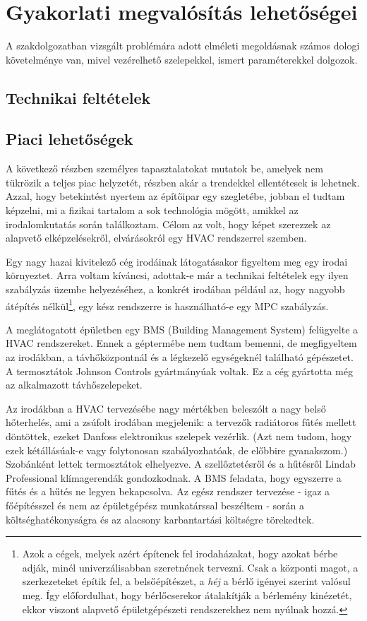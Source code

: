\chapter{Gyakorlati megvalósítás lehetőségei}

A szakdolgozatban vizsgált problémára adott elméleti megoldásnak számos dologi követelménye van, mivel vezérelhető szelepekkel, ismert paraméterekkel dolgozok. 

\section{Technikai feltételek}


\section{Piaci lehetőségek}

A következő részben személyes tapasztalatokat mutatok be, amelyek nem tükrözik a teljes piac helyzetét, részben akár a trendekkel ellentétesek is lehetnek. Azzal, hogy betekintést nyertem az építőipar egy szegletébe, jobban el tudtam képzelni, mi a fizikai tartalom a sok technológia mögött, amikkel az irodalomkutatás során találkoztam. Célom az volt, hogy képet szerezzek az alapvető elképzelésekről, elvárásokról egy HVAC rendszerrel szemben.

Egy nagy hazai kivitelező cég irodáinak látogatásakor figyeltem meg egy irodai környeztet. Arra voltam kíváncsi, adottak-e már a technikai feltételek egy ilyen szabályzás üzembe helyezéséhez, a konkrét irodában például az, hogy nagyobb átépítés nélkül\footnote{Azok a cégek, melyek azért építenek fel irodaházakat, hogy azokat bérbe adják, minél univerzálisabban szeretnének tervezni. Csak a központi magot, a szerkezeteket építik fel, a belsőépítészet, a \textit{héj} a bérlő igényei szerint valósul meg. Így előfordulhat, hogy bérlőcserekor átalakítják a bérlemény kinézetét, ekkor viszont alapvető épületgépészeti rendszerekhez nem nyúlnak hozzá.}, egy kész rendszerre is használható-e egy MPC szabályzás.

A meglátogatott épületben egy BMS (Building Management System) felügyelte a HVAC rendszereket. Ennek a géptermébe nem tudtam bemenni, de megfigyeltem az irodákban, a távhőközpontnál és a légkezelő egységeknél található gépészetet. A termosztátok Johnson Controls gyártmányúak voltak. Ez a cég gyártotta még az alkalmazott távhőszelepeket.

Az irodákban a HVAC tervezésébe nagy mértékben beleszólt a nagy belső hőterhelés, ami a zsúfolt irodában megjelenik: a tervezők radiátoros fűtés mellett döntöttek, ezeket Danfoss elektronikus szelepek vezérlik. (Azt nem tudom, hogy ezek kétállásúak-e vagy folytonosan szabályozhatóak, de előbbire gyanakszom.) Szobánként lettek termosztátok elhelyezve. A szellőztetésről és a hűtésről Lindab Professional klímagerendák gondozkodnak. A BMS feladata, hogy egyszerre a fűtés és a hűtés ne legyen bekapcsolva. Az egész rendszer tervezése - igaz a főépítésszel és nem az épületgépész munkatárssal beszéltem - során a költséghatékonyságra és az alacsony karbantartási költségre törekedtek.

